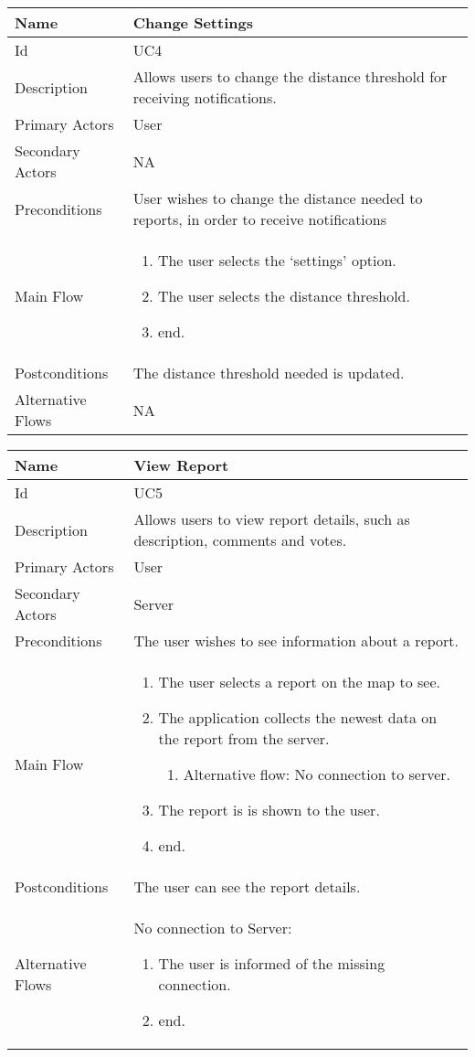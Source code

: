 \begin{tabularx}{\textwidth}{|l|X|}
\hline
Name              & Change Settings \\ \hline 
Id                & UC4 \\ \hline
Description       & Allows users to change the distance threshold for receiving notifications. \\ \hline
Primary Actors    & User \\ \hline
Secondary Actors  & NA \\ \hline
Preconditions     & User wishes to change the distance needed to reports, in order to receive notifications \\ \hline
Main Flow         &
{\footnotesize \begin{enumerate}
\item The user selects the ‘settings’ option.
\item The user selects the distance threshold.
\item end.
\end{enumerate}} \\ \hline
Postconditions    & The distance threshold needed is updated. \\ \hline
Alternative Flows & NA \\ \hline
\end{tabularx}

\begin{tabularx}{\textwidth}{|l|X|}
\hline
Name              & View Report \\ \hline 
Id                & UC5 \\ \hline
Description       & Allows users to view report details, such as description, comments and votes. \\ \hline
Primary Actors    & User \\ \hline
Secondary Actors  & Server \\ \hline
Preconditions     & The user wishes to see information about a report. \\ \hline
Main Flow         &
{\footnotesize \begin{enumerate}
\item The user selects a report on the map to see.
\item The application collects the newest data on the report from the server.
\begin{enumerate}
\item Alternative flow: No connection to server.
\end{enumerate}
\item The report is is shown to the user.
\item end.
\end{enumerate}} \\ \hline
Postconditions    & The user can see the report details. \\ \hline
Alternative Flows & 
No connection to Server:
{\footnotesize \begin{enumerate}
\item The user is informed of the missing connection.
\item end.
\end{enumerate}}
\\ \hline
\end{tabularx}

